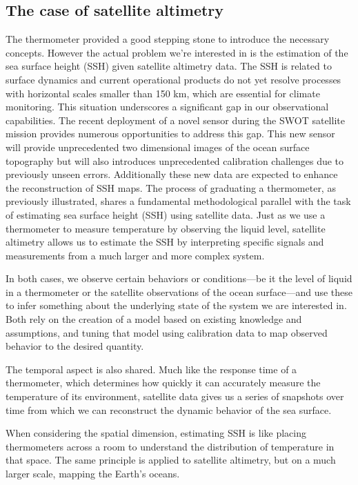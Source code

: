 \begin{bibunit}
\subsection{The case of satellite altimetry}
  The thermometer provided a good stepping stone to introduce the necessary concepts.
  However the actual problem we're interested in is the estimation of the sea surface height (SSH) given satellite altimetry data.
  The SSH is related to surface dynamics and current operational products do not yet resolve processes with horizontal scales smaller than 150 km, which are essential for climate monitoring.
  This situation underscores a significant gap in our observational capabilities.
  The recent deployment of a novel sensor during the SWOT satellite mission provides numerous opportunities to address this gap.
  This new sensor will provide unprecedented two dimensional images of the ocean surface topography but will also introduces unprecedented calibration challenges due to previously unseen errors. Additionally these new data are expected to enhance the reconstruction of SSH maps.
The process of graduating a thermometer, as previously illustrated, shares a fundamental methodological parallel with the task of estimating sea surface height (SSH) using satellite data.
Just as we use a thermometer to measure temperature by observing the liquid level, satellite altimetry allows us to estimate the SSH by interpreting specific signals and measurements from a much larger and more complex system.

In both cases, we observe certain behaviors or conditions—be it the level of liquid in a thermometer or the satellite observations of the ocean surface—and use these to infer something about the underlying state of the system we are interested in. Both rely on the creation of a model based on existing knowledge and assumptions, and tuning that model using calibration data to map observed behavior to the desired quantity.

The temporal aspect is also shared. Much like the response time of a thermometer, which determines how quickly it can accurately measure the temperature of its environment, satellite data gives us a series of snapshots over time from which we can reconstruct the dynamic behavior of the sea surface.

When considering the spatial dimension, estimating SSH is like placing thermometers across a room to understand the distribution of temperature in that space. The same principle is applied to satellite altimetry, but on a much larger scale, mapping the Earth's oceans.


\end{bibunit}
